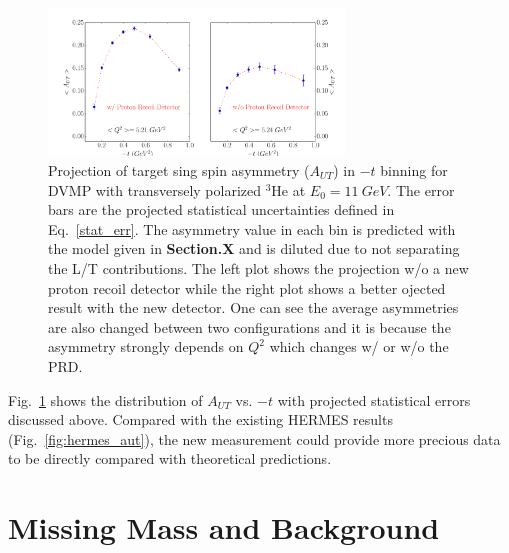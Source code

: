 \begin{figure}[!ht]
 \begin{center}
      \includegraphics[type=pdf, ext=.pdf,read=.pdf,width=0.7\textwidth]{./figures/bin_asym_t}
      \caption{\footnotesize{Projection of target sing spin asymmetry ($A_{UT}$) in $-t$ binning for DVMP with transversely polarized $\mathrm{^{3}He}$ at $E_{0}=11~GeV$. The error bars are the projected statistical uncertainties defined in Eq.~\ref{stat_err}. The asymmetry value in each bin is predicted with the model given in {\bf Section.X} and is diluted due to not separating the L/T contributions. The left plot shows the projection w/o a new proton recoil detector while the right plot shows a better ojected result with the new detector. One can see the average asymmetries are also changed between two configurations and it is because the asymmetry strongly depends on $Q^{2}$ which changes w/ or w/o the PRD.}}
  \label{asym_t}
  \end{center}
\end{figure}
Fig.~\ref{asym_t} shows the distribution of $A_{UT}$ vs. $-t$ with projected statistical errors discussed above. Compared with the existing HERMES results (Fig.~\ref{fig:hermes_aut}), the new measurement could provide more precious data to be directly compared with theoretical predictions. 

\section{Missing Mass and Background}

